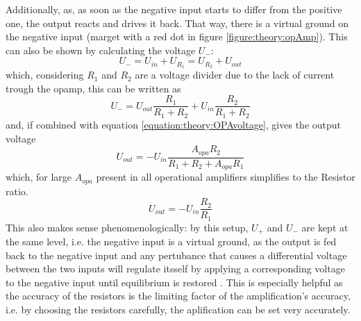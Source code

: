                 Additionally, as, as soon as the negative input starts to differ from the positive one, the output reacts and drives it back. That way, there is a virtual ground on the negative input (marget with a red dot in figure \ref{figure:theory:opAmp}).
                This can also be shown by calculating the voltage $U_-$:
                \begin{equation}
                    U_- = U_{in} + U_{R_1} = U_{R_2} + U_{out}
                \end{equation}
                which, considering $R_1$ and $R_2$ are a voltage divider due to the lack of current trough the opamp, this can be written as
                \begin{equation}
                    U_{-} = U_{out} \frac{R_1}{R_1+R_2} + U_{in} \frac{R_2}{R_1+R_2}
                \end{equation}
                and, if combined with equation \ref{equation:theory:OPAvoltage}, gives the output voltage
                \begin{equation}
                    U_{out} = -U_{in} \frac{A_{opa}R_2}{R_1+R_2 + A_{opa}R_1}
                \end{equation}
                which, for large $A_{opa}$ present in all operational amplifiers simplifies to the Resistor ratio.
                \begin{equation}
                    U_{out} = -U_{in}\frac{R_2}{R_1}
                \end{equation}
                This also makes sense phenomenologically: by this setup, $U_{+}$ and $U_{-}$ are kept at the same level, i.e. the negative input is a virtual ground, as the output is fed back to the negative input and any pertubance that causes a differential voltage between the two inputs will regulate itsself by applying a corresponding voltage to the negative input until equilibrium is restored \cite{huijsing_operational_2017-1}.
                This is especially helpful as the accuracy of the resistors is the limiting factor of the amplification's accuracy, i.e. by choosing the resistors carefully, the aplification can be set very accurately.
